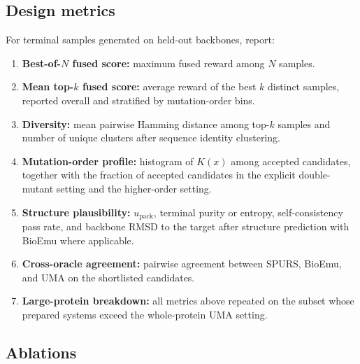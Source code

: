 \documentclass[11pt]{article}
\newcommand{\packunc}{\ensuremath{u_{\mathrm{pack}}}}
\begin{document}
\subsection{Design metrics}

For terminal samples generated on held-out backbones, report:
\begin{enumerate}[leftmargin=1.5em]
    \item \textbf{Best-of-$N$ fused score:} maximum fused reward among $N$ samples.
    \item \textbf{Mean top-$k$ fused score:} average reward of the best $k$ distinct samples, reported overall and stratified by mutation-order bins.
    \item \textbf{Diversity:} mean pairwise Hamming distance among top-$k$ samples and number of unique clusters after sequence identity clustering.
    \item \textbf{Mutation-order profile:} histogram of $K(x)$ among accepted candidates, together with the fraction of accepted candidates in the explicit double-mutant setting and the higher-order setting.
    \item \textbf{Structure plausibility:} \packunc, terminal purity or entropy, self-consistency pass rate, and backbone RMSD to the target after structure prediction with BioEmu where applicable.
    \item \textbf{Cross-oracle agreement:} pairwise agreement between SPURS, BioEmu, and UMA on the shortlisted candidates.
    \item \textbf{Large-protein breakdown:} all metrics above repeated on the subset whose prepared systems exceed the whole-protein UMA setting.
\end{enumerate}


\subsection{Ablations}
\end{document}
